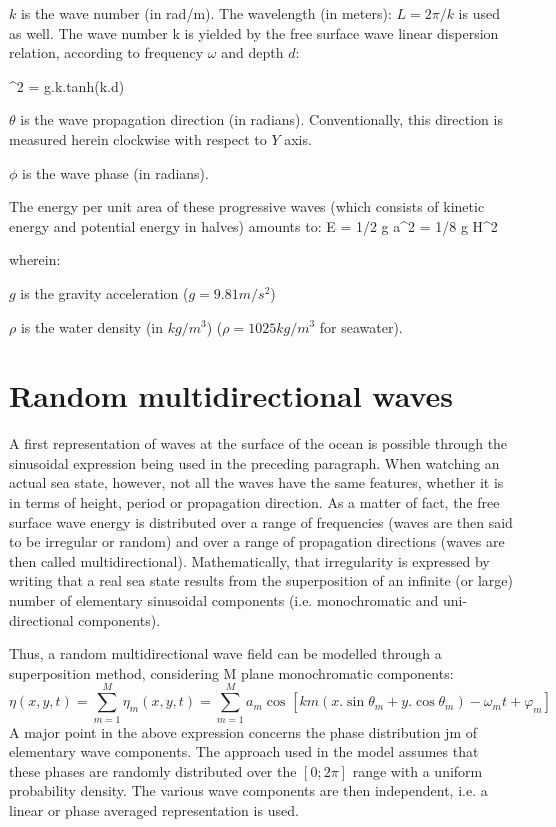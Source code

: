  $k$ is the wave number (in rad/m). The wavelength (in meters): $L = 2\pi/k$ is used as well. The wave number k is yielded by the free surface wave linear dispersion relation, according to frequency $\omega$  and depth $d$:

\bequ
\label{reldisp}
 \omega^2 = g.k.tanh(k.d) 
\eequ

 $\theta$ is the wave propagation direction (in radians). Conventionally, this direction is measured herein clockwise with respect to $Y$ axis.

 $\phi$  is the wave phase (in radians).

 The energy per unit area of these progressive waves (which consists of kinetic energy and potential energy in halves) amounts to:
\bequ
\label{defenergy}
E = 1/2 \rho g a^2 = 1/8 \rho g H^2 
\eequ

 wherein:

 $g$ is the gravity acceleration ($g = 9.81 m/s^{2}$)

 $\rho$ is the water density (in $kg/m^{3}$) ($\rho = 1025 kg/ m^{3}$ for seawater).


\section{ Random multidirectional waves}

 A first representation of waves at the surface of the ocean is possible through the sinusoidal expression being used in the preceding paragraph. When watching an actual sea state, however, not all the waves have the same features, whether it is in terms of height, period or propagation direction. As a matter of fact, the free surface wave energy is distributed over a range of frequencies (waves are then said to be irregular or random) and over a range of propagation directions (waves are then called multidirectional). Mathematically, that irregularity is expressed by writing that a real sea state results from the superposition of an infinite (or large) number of elementary sinusoidal components (i.e. monochromatic and uni-directional components).

Thus, a random multidirectional wave field can be modelled through a superposition method, considering M plane monochromatic components:
\begin{equation} \label{GrindEQ__2_4_}
\eta (x,y,t)=\sum _{m=1}^{M}\eta _{m}^{}  (x,y,t)=\sum _{m=1}^{M}a_{m}^{} \cos _{}^{}  [km(x.\sin \theta _{m} +y.\cos \theta _{m} )-\omega _{m} t+\varphi _{m} ]
\end{equation}
A major point in the above expression concerns the phase distribution jm of elementary wave components. The approach used in the \tomawac model assumes that these phases are randomly distributed over the $[0;2\pi]$ range with a uniform probability density. The various wave components are then independent, i.e. a linear or phase averaged representation is used.

